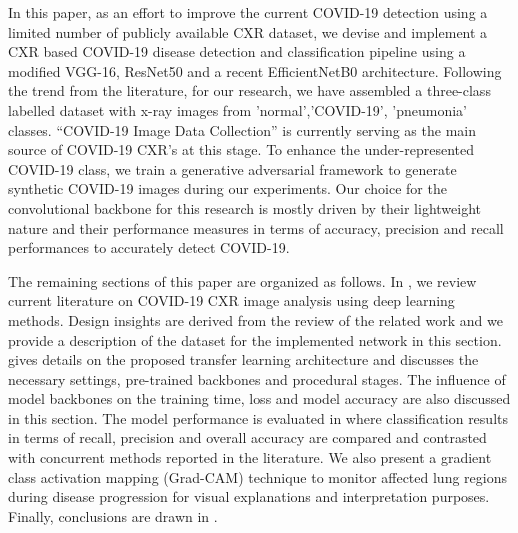  
 In this paper, as an effort to improve the current COVID-19 detection using a limited number of publicly available CXR dataset,  we devise and implement a CXR based COVID-19 disease detection and classification pipeline using a modified VGG-16, ResNet50 \cite{he2016deep} and a recent EfficientNetB0 \cite{tan2019efficientnet} architecture. Following the trend from the literature, for our research, we have assembled a three-class labelled dataset with x-ray images from 'normal','COVID-19', 'pneumonia' classes. “COVID-19 Image Data Collection” \cite{cohen2020covid} is currently serving as the main source of COVID-19 CXR's at this stage. To enhance the under-represented COVID-19 class, we train a generative adversarial framework to generate synthetic COVID-19 images during our experiments. Our choice for the convolutional backbone for this research is mostly driven by their lightweight nature and their performance measures in terms of accuracy, precision and recall performances to accurately detect COVID-19.


The remaining sections of this paper are organized as follows. In , we review current literature on COVID-19 CXR image analysis using deep learning methods. Design insights are derived from the review of the related work and we provide a description of the dataset for the implemented network in this section.  gives details on the proposed transfer learning architecture and discusses the necessary settings, pre-trained backbones and procedural stages. The influence of model backbones on the training time, loss and model accuracy are also discussed in this section. The model performance is evaluated in  where classification results in terms of recall, precision and overall accuracy are compared and contrasted with concurrent methods reported in the literature. We also present a gradient class activation mapping (Grad-CAM) technique to monitor affected lung regions during disease progression for visual explanations and interpretation purposes. Finally, conclusions are drawn in .


